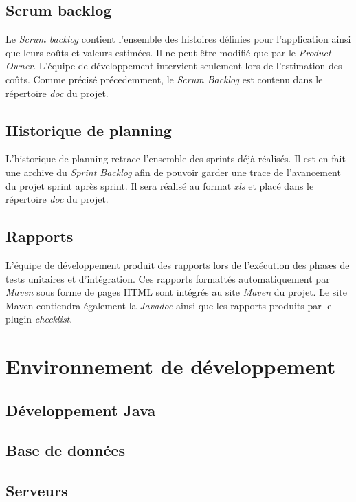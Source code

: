 \documentclass[11pt]{article}
\begin{document}
\subsection{Scrum backlog}

Le \emph{Scrum backlog} contient l'ensemble des histoires définies pour
l'application ainsi que leurs coûts et valeurs estimées. Il ne peut être modifié
que par le \emph{Product Owner}. L'équipe de développement intervient seulement
lors de l'estimation des coûts. Comme précisé précedemment, le \emph{Scrum Backlog} est contenu dans le répertoire \emph{doc} du projet.

\subsection{Historique de planning}

L'historique de planning retrace l'ensemble des sprints déjà réalisés. Il est en fait une archive du \emph{Sprint Backlog} afin de pouvoir garder une trace de l'avancement du projet sprint après sprint. Il sera réalisé au format \emph{xls} et placé dans le répertoire \emph{doc} du projet.

\subsection{Rapports}

L'équipe de développement produit des rapports lors de l'exécution des phases
de tests unitaires et d'intégration. Ces rapports formattés automatiquement
par \emph{Maven} sous forme de pages HTML sont intégrés au site \emph{Maven} du
projet. Le site Maven contiendra également la \emph{Javadoc} ainsi que les rapports produits par le plugin \emph{checklist}.


\section{Environnement de développement}
\label{env-dev}

\subsection{Développement Java}

\subsection{Base de données}

\subsection{Serveurs}
\end{document}

